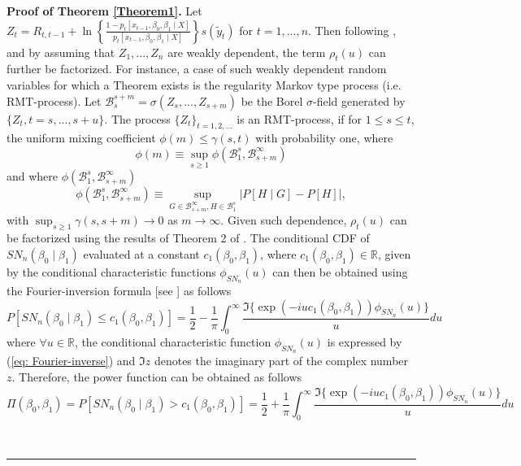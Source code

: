 \documentclass[harvard,11pt]{article}
\newenvironment{proof}[1][Proof]{\textbf{#1.} }{\  \rule{0.5em}{0.5em}}
\begin{document}
\begin{proof}[Proof of Theorem \protect\ref{Theorem1}]
Let $Z_t=R_{t,t-1}+\ln\left\{\frac{1-p_t[x_{t-1},\beta_0,\beta_1\mid X]}{p_t[x_{t-1},\beta_0,\beta_1\mid X]}\right\}s(\tilde{y}_t)$ for $t=1,...,n$. Then following \citet{heinrich1982factorization}, and by assuming that $Z_1,...,Z_n$ are weakly dependent, the term $\rho_t(u)$ can further be factorized. For instance, a case of such weakly dependent random variables for which a Theorem exists is the regularity Markov type process (i.e. RMT-process). Let $\mathcal{B}_s^{s+m}=\sigma(Z_s,...,Z_{s+m})$ be the Borel $\sigma$-field generated by $\{Z_t, t=s,...,s+u\}$. The process $\{Z_t\}_{t=1,2,...}$ is an RMT-process, if for $1\leq s\leq t$, the uniform mixing coefficient $\phi(m)\leq\gamma(s,t)$ with probability one, where 
\begin{equation*}
\phi(m)\equiv\sup_{s\geq 1}\phi(\mathcal{B}_{1}^s,\mathcal{B}_{s+m}^\infty)
\end{equation*}
and where $\phi(\mathcal{B}_{1}^s,\mathcal{B}_{s+m}^\infty)$
\begin{equation*}
\phi(\mathcal{B}_{1}^s,\mathcal{B}_{s+m}^\infty)\equiv \sup_{G\in\mathcal{B}_{s+m}^{\infty},H\in \mathcal{B}_{1}^s}\lvert P[H\mid G]-P[H]\lvert,
\end{equation*}
with $\sup_{s\geq1}\gamma(s,s+m)\rightarrow0$ as $m\rightarrow \infty$. Given such dependence, $\rho_t(u)$ can be factorized using the results of Theorem 2 of \citet{heinrich1982factorization}.
The conditional CDF of $SN_n(\beta_0\mid\beta_1)$ evaluated at a constant $c_1(\beta_0,\beta_1)$, where $c_1(\beta_0,\beta_1)\in\mathbb{R}$, given by the conditional characteristic functions $\phi_{SN_n}(u)$ can then be obtained using the Fourier-inversion formula [see \citet{gil1951note}] as follows
\[
P[SN_n(\beta_0\mid \beta_1)\leq c_1(\beta_0,\beta_1)]=\frac{1}{2}-\frac{1}{\pi}\int_{0}^{\infty}\frac{\Im\{\exp(-iuc_1(\beta_0,\beta_1))\phi_{SN_n}(u)\}}{u}du
\] 
where $\forall u \in \mathbb{R}$, the conditional characteristic function $\phi_{SN_n}(u)$ is expressed by (\ref{eq: Fourier-inverse}) and $\Im{z}$ denotes the imaginary part of the complex number $z$. Therefore, the power function can be obtained as follows
\[
\Pi(\beta_0,\beta_1)=P[SN_n(\beta_0\mid \beta_1)> c_1(\beta_0,\beta_1)]=\frac{1}{2}+\frac{1}{\pi}\int_{0}^{\infty}\frac{\Im\{\exp(-iuc_1(\beta_0,\beta_1))\phi_{SN_n}(u)\}}{u}du
\] 

\end{proof}
\newpage
\end{document}
